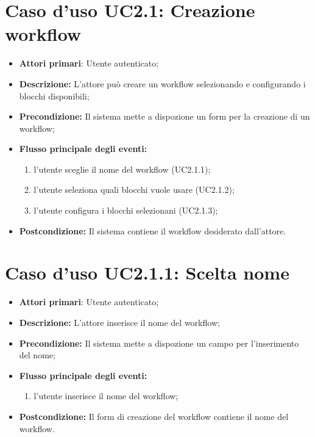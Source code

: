 		\section{Caso d'uso UC2.1: Creazione workflow}
		\begin{itemize}
			\item \textbf{Attori primari}: Utente autenticato;
			\item \textbf{Descrizione:} L'attore può creare un workflow selezionando e configurando i blocchi disponibili;
			\item \textbf{Precondizione:} Il sistema mette a dispozione un form per la creazione di un workflow;
			\item \textbf{Flusso principale degli eventi:}
			\begin{enumerate}
				\item l'utente sceglie il nome del workflow (UC2.1.1);
				\item l'utente seleziona quali blocchi vuole usare (UC2.1.2);
				\item l'utente configura i blocchi selezionani (UC2.1.3);
			\end{enumerate}
			\item \textbf{Postcondizione:} Il sistema contiene il workflow desiderato dall'attore.
		\end{itemize}
		\section{Caso d'uso UC2.1.1: Scelta nome }
		\begin{itemize}
			\item \textbf{Attori primari}: Utente autenticato;
			\item \textbf{Descrizione:} L'attore inserisce il nome del workflow;
			\item \textbf{Precondizione:} Il sistema mette a dispozione un campo per l'inserimento del nome;
			\item \textbf{Flusso principale degli eventi:}
			\begin{enumerate}
				\item l'utente inserisce il nome del workflow;
			\end{enumerate}
			\item \textbf{Postcondizione:} Il form di creazione del workflow contiene il nome del workflow.
		\end{itemize}
